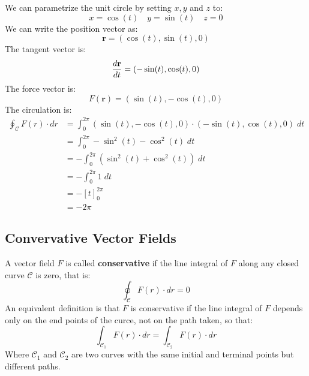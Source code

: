 \documentclass[a4paper, 10pt]{article}
\begin{document}
\begin{examplebox}[Find the circulation of the vector $F = (y, -x, 0)$ around the unit circle $\mathcal{C} = x^2 + y^2 = 1$, $z=0$, taken in an anti-clockwise direction]
  We can parametrize the unit circle by setting $x,y$ and $z$ to:
  $$x = \cos(t) \quad y = \sin(t) \quad z = 0$$
  We can write the position vector as:
  $$\mathbf{r} = (\cos(t), \sin(t), 0)$$
  The tangent vector is:
  $$\frac{d\mathbf{r}}{dt} = (-\sin(t), \cos(t), 0)$$
  The force vector is:
  $$F(\mathbf{r}) = (\sin(t), -\cos(t), 0)$$
  The circulation is:
  \begin{align}
    \oint_{\mathcal{C}} F(r) \cdot dr & = \int_0^{2\pi} (\sin(t), -\cos(t), 0) \cdot (-\sin(t), \cos(t), 0) \; dt \\
                                      & = \int_0^{2\pi} -\sin^2(t) - \cos^2(t) \; dt                              \\
                                      & = -\int_0^{2\pi} (\sin^2(t) + \cos^2(t)) \; dt                            \\
                                      & = -\int_0^{2\pi} 1 \; dt                                                  \\
                                      & = -\left[t\right]_0^{2\pi}                                                \\
                                      & = -2\pi
  \end{align}
\end{examplebox}


\subsection{Convervative Vector Fields}
A vector field $F$ is called \textbf{conservative} if the line integral of $F$ along any closed curve $\mathcal{C}$ is zero, that is:
$$\oint_{\mathcal{C}} F(r) \cdot dr = 0$$
An equivalent definition is that $F$ is conservative if the line integral of $F$ depends only on the end points of the curce, not on the path taken, so that:
$$\int_{\mathcal{C}_1} F(r) \cdot dr = \int_{\mathcal{C}_2} F(r)\cdot dr$$
Where $\mathcal{C}_1$ and $\mathcal{C}_2$ are two curves with the same initial and terminal points but different paths.
\end{document}
